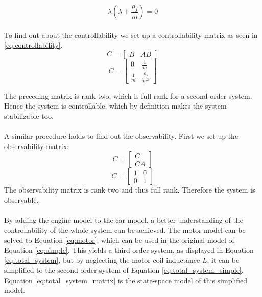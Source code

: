 \documentclass[final]{scrreprt} %
\begin{document}
\begin{equation}
	\lambda(\lambda + \frac{\rho_f}{m}) = 0
	\label{eq:char_eq_final}
\end{equation}
\\
To find out about the controllability we set up a controllability matrix as seen in \ref{eq:controllability}.
\begin{equation}
C =
\begin{bmatrix}
B & AB
\end{bmatrix}
\end{equation}
\begin{equation}
C =
\begin{bmatrix}
0 & \frac{1}{m}\\
\frac{1}{m} & \frac{\rho_f}{m^2}
\end{bmatrix}\label{eq:controllability}
\end{equation}

The preceding matrix is rank two, which is full-rank for a second order system. Hence the system is controllable, which by definition makes the system stabilizable too.
\\\\
A similar procedure holds to find out the observability. First we set up the observability matrix:
\begin{equation}
C =
\begin{bmatrix}
C\\
CA
\end{bmatrix}
\end{equation}
\begin{equation}
C =
\begin{bmatrix}
1 & 0\\
0 & 1
\end{bmatrix}\label{eq:observability}
\end{equation}
The observability matrix is rank two and thus full rank. Therefore the system is observable.
\\\\

By adding the engine model to the car model, a better understanding of the controllability of the whole system can be achieved. The motor model can be solved to Equation \ref{eq:motor}, which can be used in the original model of Equation \ref{eq:simple}. This yields a third order system, as displayed in Equation \ref{eq:total_system}, but by neglecting the motor coil inductance $L$, it can be simplified to the second order system of Equation \ref{eq:total_system_simple}. Equation \ref{eq:total_system_matrix} is the state-space model of this simplified model.
\end{document}
